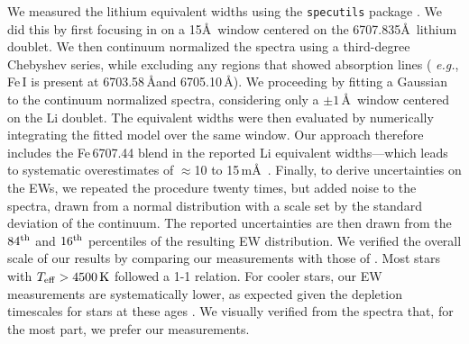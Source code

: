 \documentclass[12pt,twocolumn,tighten]{aastex63}
\begin{document}
%
%

We measured the lithium equivalent widths using the \texttt{specutils}
package \citep{specutils_v1pt1}.  We did this by first focusing in on
a 15\AA\ window centered on the 6707.835\AA\ lithium doublet.  We then
continuum normalized the spectra using a third-degree Chebyshev
series, while excluding any regions that showed absorption lines ({\it
e.g.}, Fe\,\textsc{I} is present at 6703.58\,\AA and 6705.10\,\AA).
We proceeding by fitting a Gaussian to the continuum normalized
spectra, considering only a $\pm 1\,$\AA\ window centered on the Li
doublet.  The equivalent widths were then evaluated by numerically
integrating the fitted model over the same window.  Our approach
therefore includes the Fe\,6707.44 blend in the reported Li equivalent
widths---which leads to systematic overestimates of $\approx$10 to
15\,m\AA\ \citep[{\it e.g.},][]{bouvier_pleiades_lirot_2018}.
Finally, to derive uncertainties on the EWs, we repeated the procedure
twenty times, but added noise to the spectra, drawn from a normal
distribution with a scale set by the standard deviation of the
continuum.  The reported uncertainties are then drawn from the
$84^{\rm th}$ and $16^{\rm th}$ percentiles of the resulting EW
distribution.  We verified the overall scale of our results by
comparing our measurements with those of \citet{randich_gaiaeso_2018}.
Most stars with $T_{\rm eff} > 4500\,{\rm K}$ followed a 1-1 relation.
For cooler stars, our EW measurements are systematically lower, as
expected given the depletion timescales for stars at these ages
\citep[{\it e.g.},][]{soderblom_ages_2014}.  We visually verified from
the spectra that, for the most part, we prefer our measurements.


\end{document}
